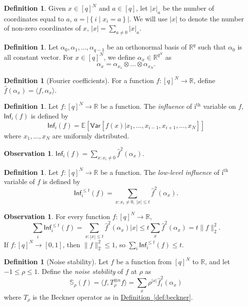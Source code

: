 \documentclass[10pt]{article}
\theoremstyle{definition}
\newtheorem{definition}[theorem]{Definition}
\numberwithin{equation}{section}
\newcommand{\R}{{\mathbb R}}
\newcommand{\expref}[2]{\texorpdfstring{\hyperref[#2]{#1~\ref{#2}}}{#1~\ref{#2}}}
\newtheorem{observation}[theorem]{Observation}
\newcommand{\expct}[2]{\mathbb{E}_{#1}\left[#2\right]}
\newcommand{\var}[2]{\mathsf{Var}_{#1}\left[#2\right]}
\newcommand{\infl}{\ensuremath{\mathsf{Inf}}}
\newcommand{\texsup}[2]{\ensuremath{\text{#1}^{\text{#2}}}}
\renewcommand{\le}{\leqslant}
\begin{document}
\begin{definition}
  Given $x\in [q]^N$ and $a\in[q]$, let $|x|_a$ be the number of coordinates
equal to $a$, $a=\left| \left\{ i\mid x_i = a\right\}\right|$.
We will use $|x|$ to denote the number of non-zero coordinates of $x$,
$|x| = \sum_{a\neq 0} |x|_a$.
\end{definition}
\begin{definition}
  Let $\alpha_0,\alpha_1,\ldots,\alpha_{q-1}$ be an orthonormal basis
  of $\R^q$ such that $\alpha_0$ is all constant vector. For
  $x\in[q]^N$, we define $\alpha_x \in \R^{q^N}$ as
  \[ \alpha_x = \alpha_{x_1}\otimes \ldots \otimes \alpha_{x_N}.\] 
\end{definition}
\begin{definition}[Fourier coefficients]
  For a function $f:[q]^N\to\R$, define $\hat{f}(\alpha_x) =
  \langle f, \alpha_x \rangle$.
\end{definition}
%
\begin{definition}
  Let $f:[q]^N\rightarrow \R$ be a function. The
  \emph{influence} of \texsup{i}{th} variable on $f$, $\infl_i(f)$ is
  defined by
  \[ \infl_i(f) = 
      \expct{}
            {\var{}{f(x)|x_1,\ldots,x_{i-1},x_{i+1},\ldots,x_N}}\]
  where $x_1,\ldots,x_N$ are uniformly distributed.
%
\end{definition}
\begin{observation}
  $\infl_i (f) = \sum_{x:x_i\neq 0} \hat{f}^2(\alpha_x)$.
\end{observation}
%
\begin{definition}
  Let $f:[q]^N\rightarrow \R$ be a function. The \emph{low-level
    influence} of \texsup{i}{th} variable of $f$ is defined by
  \[ \infl_i^{\le t}(f) = \sum_{x:x_i\neq 0,\ |x|\le t} \hat{f}^2(\alpha_x).\]
\end{definition}
%
\begin{observation}
  For every function $f:[q]^N\to\mathbb{R}$, \[\sum_i \infl_i^{\le
    t}(f) = \sum_{x:|x|\le t} \hat{f}^2(\alpha_x) |x|\le t \sum_x
  \hat{f}^2(\alpha_x) = t \|f\|^2_2.\] If $f:[q]^N\to[0,1]$, then
  $\|f\|^2_2 \le 1$, so $\sum_i \infl_i^{\le t}(f) \le t$.
\end{observation}
%
\begin{definition}[Noise stability]
  Let $f$ be a function from $[q]^N$ to $\R$, and let $-1\le \rho\le
  1$. Define the \emph{noise stability} of $f$ at $\rho$ as
  \[ \mathbb{S}_{\rho}(f) = \langle f, T^{\otimes n}_\rho f\rangle =
  \sum_x \rho^{|x|} \hat{f}^2_i(\alpha_x)\] where $T_{\rho}$ is the
  Beckner operator as in \expref{Definition}{def:beckner}.
\end{definition}
\end{document}
